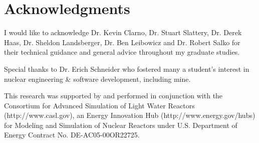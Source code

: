 
\section*{Acknowledgments}

I would like to acknowledge Dr. Kevin Clarno, Dr. Stuart Slattery, Dr. Derek Haas, Dr. Sheldon Landsberger, Dr. Ben Leibowicz and Dr. Robert Salko for their technical guidance and general advice throughout my graduate studies.

Special thanks to Dr. Erich Schneider who fostered many a student's interest in nuclear engineering \& software development, including mine.

This research was supported by and performed in conjunction with the Consortium for Advanced Simulation of Light Water Reactors (http://www.casl.gov), an Energy Innovation Hub (http://www.energy.gov/hubs) for Modeling and Simulation of Nuclear Reactors under U.S. Department of Energy Contract No. DE-AC05-00OR22725.
\newpage
